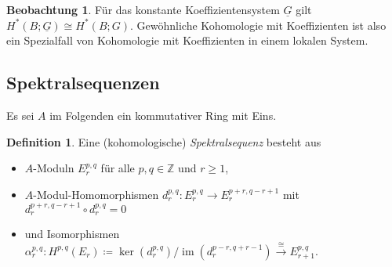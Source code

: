 \documentclass[11pt, a4paper, german]{article}
\theoremstyle{definition}
\newtheorem*{defn}{Definition}
\newtheorem*{beob}{Beobachtung}
\theoremstyle{remark}
\newcommand{\Z}{\mathbb{Z}} %
\DeclareMathOperator{\im}{im} %
\newcommand{\ES}{Es sei} %
\begin{document}
\begin{beob}
  Für das konstante Koeffizientensystem $\underline{G}$ gilt $H^*(B; \underline{G}) \cong H^*(B; G)$.
  Gewöhnliche Kohomologie mit Koeffizienten ist also ein Spezialfall von Kohomologie mit Koeffizienten in einem lokalen System.
\end{beob}

\subsection{Spektralsequenzen}


\ES{} $A$ im Folgenden ein kommutativer Ring mit Eins.

\begin{defn}
  Eine (kohomologische) \emph{Spektralsequenz} besteht aus
  \begin{itemize}
    \item $A$-Moduln $E_r^{p,q}$ für alle $p, q \in \Z$ und $r \geq 1$,
    \item $A$-Modul-Homomorphismen $d_r^{p,q} : E_r^{p,q} \to E_r^{p+r,q-r+1}$ mit $d_r^{p+r,q-r+1} \circ d_r^{p,q} = 0$
    \item und Isomorphismen $\alpha_r^{p,q} : H^{p,q}(E_r) \!\coloneqq\! \ker(d_r^{p,q}) / \im(d_r^{p-r,q+r-1}) \xrightarrow{\cong} E_{r+1}^{p,q}$.
  \end{itemize}
\end{defn}
\end{document}
